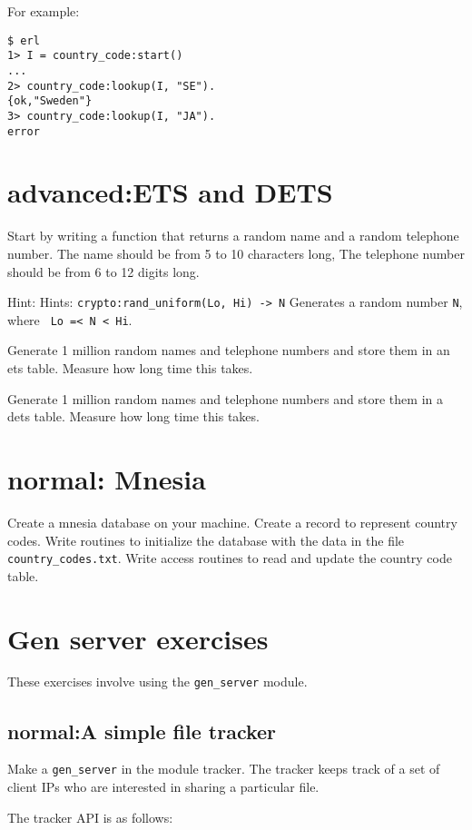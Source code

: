 \documentclass[12pt]{hitec}
\begin{document}
For example:

\begin{Verbatim}
$ erl
1> I = country_code:start()
...
2> country_code:lookup(I, "SE").
{ok,"Sweden"}
3> country_code:lookup(I, "JA").
error
\end{Verbatim}


\section{advanced:ETS and DETS}

Start by writing a function that returns a random name and a random
telephone number.  The name should be from 5 to 10 characters long,
The telephone number should be from 6 to 12 digits long.

Hint: Hints: \verb+crypto:rand_uniform(Lo, Hi) -> N+ Generates a
random number \verb+N+, where \verb+ Lo =< N < Hi+.

Generate 1 million random names and telephone numbers and store them in an ets table.
Measure how long time this takes.

Generate 1 million random names and telephone numbers and store them in a dets table.
Measure how long time this takes.

\section{normal: Mnesia}

Create a mnesia database on your machine. Create a record to represent
country codes.  Write routines to initialize the database with the data
in the file \verb+country_codes.txt+. Write access routines to read
and update the country code table.
 

\section{Gen server exercises}

These exercises involve using the \verb+gen_server+ module.

\subsection{normal:A simple file tracker}


Make a \verb+gen_server+ in the module tracker.  The tracker keeps
track of a set of client IPs who are interested in sharing a
particular file.

The tracker API is as follows:
\end{document}
